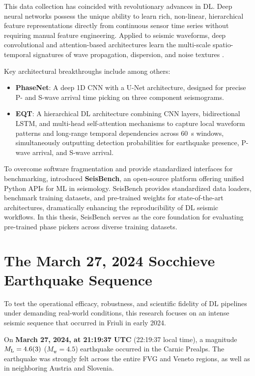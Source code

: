 This data collection has coincided with revolutionary advances in \acf{DL}.
Deep neural networks possess the unique ability to learn rich, non-linear,
hierarchical feature representations directly from continuous sensor time
series without requiring manual feature engineering. Applied to seismic
waveforms, deep convolutional and attention-based architectures learn the
multi-scale spatio-temporal signatures of wave propagation, dispersion, and
noise textures \parencite{MousaviBeroza2022}.

Key architectural breakthroughs include among others:
\begin{itemize}
  \item \textbf{\acl{PhaseNet}}: A deep 1D \ac{CNN} with a U-Net architecture,
    designed for precise P- and S-wave arrival time picking on three component
    seismograms.
  \item \textbf{\acl{EQT}}: A hierarchical \ac{DL} architecture combining
    \ac{CNN} layers, bidirectional \ac{LSTM}, and multi-head self-attention
    mechanisms to capture local waveform patterns and long-range temporal
    dependencies across \qty{60}{\second} windows, simultaneously outputting
    detection probabilities for earthquake presence, P-wave arrival, and S-wave
    arrival.
\end{itemize}

To overcome software fragmentation and provide standardized interfaces for
benchmarking, \textcite{SeisBench} introduced \textbf{SeisBench}, an
open-source platform offering unified Python \acp{API} for \ac{ML} in
seismology. SeisBench provides standardized data loaders, benchmark training
datasets, and pre-trained weights for state-of-the-art architectures,
dramatically enhancing the reproducibility of \ac{DL} seismic workflows. In
this thesis, SeisBench serves as the core foundation for evaluating pre-trained
phase pickers across diverse training datasets.

\section{The March 27, 2024 Socchieve Earthquake Sequence}
\label{sec:socchieve_sequence}

To test the operational efficacy, robustness, and scientific fidelity of
\ac{DL} pipelines under demanding real-world conditions, this research focuses
on an intense seismic sequence that occurred in Friuli in early 2024.

On \textbf{March 27, 2024, at 21:19:37 UTC} (22:19:37 local time), a magnitude
$M_{\mathrm{L}} = \num{4.6 \pm 0.3}$ ($M_{\mathrm{w}} = \num{4.5}$) earthquake
occurred in the Carnic Prealps. The earthquake was strongly felt across the
entire \ac{FVG} and Veneto regions, as well as in neighboring Austria and
Slovenia.

